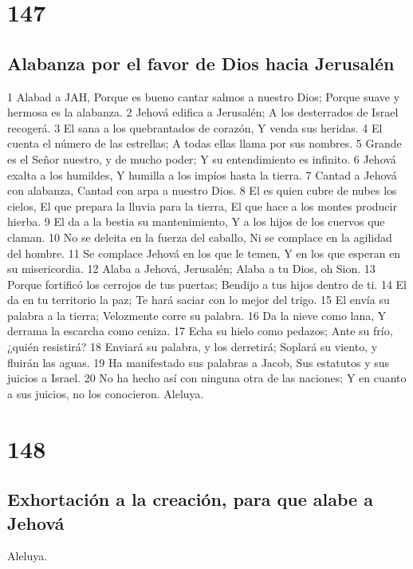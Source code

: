 \chapter{147}

\section*{Alabanza por el favor de Dios hacia Jerusalén}

1 Alabad a JAH,
Porque es bueno cantar salmos a nuestro Dios;
Porque suave y hermosa es la alabanza.
2 Jehová edifica a Jerusalén;
A los desterrados de Israel recogerá.
3 El sana a los quebrantados de corazón,
Y venda sus heridas.
4 El cuenta el número de las estrellas;
A todas ellas llama por sus nombres.
5 Grande es el Señor nuestro, y de mucho poder;
Y su entendimiento es infinito.
6 Jehová exalta a los humildes,
Y humilla a los impíos hasta la tierra.
7 Cantad a Jehová con alabanza,
Cantad con arpa a nuestro Dios.
8 El es quien cubre de nubes los cielos,
El que prepara la lluvia para la tierra,
El que hace a los montes producir hierba.
9 El da a la bestia su mantenimiento,
Y a los hijos de los cuervos que claman.
10 No se deleita en la fuerza del caballo,
Ni se complace en la agilidad del hombre.
11 Se complace Jehová en los que le temen,
Y en los que esperan en su misericordia.
12 Alaba a Jehová, Jerusalén;
Alaba a tu Dios, oh Sion.
13 Porque fortificó los cerrojos de tus puertas;
Bendijo a tus hijos dentro de ti.
14 El da en tu territorio la paz;
Te hará saciar con lo mejor del trigo.
15 El envía su palabra a la tierra;
Velozmente corre su palabra.
16 Da la nieve como lana,
Y derrama la escarcha como ceniza.
17 Echa su hielo como pedazos;
Ante su frío, ¿quién resistirá?
18 Enviará su palabra, y los derretirá;
Soplará su viento, y fluirán las aguas.
19 Ha manifestado sus palabras a Jacob,
Sus estatutos y sus juicios a Israel.
20 No ha hecho así con ninguna otra de las naciones;
Y en cuanto a sus juicios, no los conocieron.
Aleluya.

\chapter{148}

\section*{Exhortación a la creación, para que alabe a Jehová}

Aleluya.


